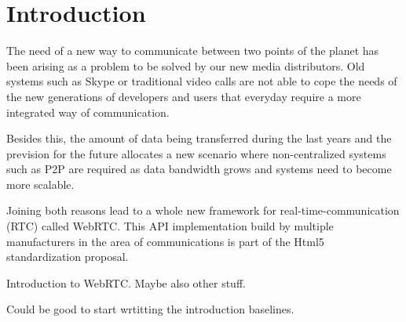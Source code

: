 \section{Introduction}

\thispagestyle{empty}

The need of a new way to communicate between two points of the planet has been arising as a problem
to be solved by our new media distributors. Old systems such as Skype or traditional video calls are not able
to cope the needs of the new generations of developers and users that everyday require a more integrated way of 
communication. 

Besides this, the amount of data being transferred during the last years and the prevision for the future allocates a new
scenario where non-centralized systems such as P2P are required as data bandwidth grows and systems need to become
more scalable. 

Joining both reasons lead to a whole new framework for real-time-communication (RTC) called WebRTC. This API implementation
build by multiple manufacturers in the area of communications is part of the Html5 standardization proposal.


Introduction to WebRTC.
Maybe also other stuff.

Could be good to start wrtitting the introduction baselines.
